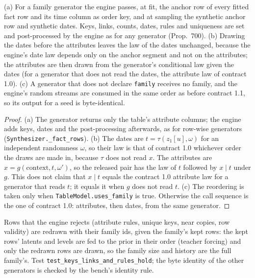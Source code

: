 \setcounter{proposition}{1861}
\begin{proposition}\label{prop:ctvaeskel}
(a) For a family generator the engine passes, at fit, the anchor row of every fitted fact row and its time column as order key, and at sampling the synthetic anchor row and synthetic dates. Keys, links, counts, dates, rules and uniqueness are set and post-processed by the engine as for any generator (Prop.~700). (b) Drawing the dates before the attributes leaves the law of the dates unchanged, because the engine's date law depends only on the anchor segment and not on the attributes; the attributes are then drawn from the generator's conditional law given the dates (for a generator that does not read the dates, the attribute law of contract 1.0). (c) A generator that does not declare \texttt{family} receives no family, and the engine's random streams are consumed in the same order as before contract 1.1, so its output for a seed is byte-identical.
\end{proposition}
\begin{proof}
(a) The generator returns only the table's attribute columns; the engine adds keys, dates and the post-processing afterwards, as for row-wise generators (\texttt{Synthesizer.\_fact\_rows}). (b) The dates are $t=\tau(z_1[u],\omega)$ for an independent randomness $\omega$, so their law is that of contract 1.0 whichever order the draws are made in, because $\tau$ does not read $x$. The attributes are $x=g(\text{context},t,\omega')$, so the released pair has the law of $t$ followed by $x\mid t$ under $g$. This does not claim that $x\mid t$ equals the contract 1.0 attribute law for a generator that reads $t$; it equals it when $g$ does not read $t$. (c) The reordering is taken only when \texttt{TableModel.uses\_family} is true. Otherwise the call sequence is the one of contract 1.0: attributes, then dates, from the same generator.
\end{proof}
\noindent Rows that the engine rejects (attribute rules, unique keys, near copies, row validity) are redrawn with their family ids, given the family's kept rows: the kept rows' latents and levels are fed to the prior in their order (teacher forcing) and only the redrawn rows are drawn, so the family size and history are the full family's. Test \texttt{test\_keys\_links\_and\_rules\_hold}; the byte identity of the other generators is checked by the bench's identity rule.


